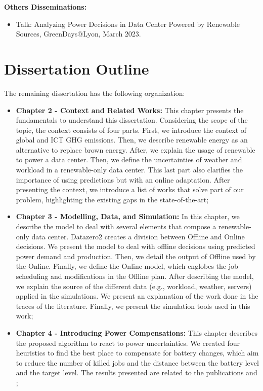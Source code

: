 \textbf{Others Disseminations:}
\begin{itemize}
    \item Talk: Analyzing Power Decisions in Data Center
    Powered by Renewable Sources, GreenDays@Lyon, March 2023.
\end{itemize}

\section{Dissertation Outline}
The remaining dissertation has the following organization:
\begin{itemize}
    \item[] \textbf{Chapter 2 - Context and Related Works:} This chapter presents the fundamentals to understand this dissertation. Considering the scope of the topic, the context consists of four parts. First, we introduce the context of global and ICT GHG emissions. Then, we describe renewable energy as an alternative to replace brown energy. After, we explain the usage of renewable to power a data center. Then, we define the uncertainties of weather and workload in a renewable-only data center. This last part also clarifies the importance of using predictions but with an online adaptation. After presenting the context, we introduce a list of works that solve part of our problem, highlighting the existing gaps in the state-of-the-art;
    \item[] \textbf{Chapter 3 - Modelling, Data, and Simulation:} In this chapter, we describe the model to deal with several elements that compose a renewable-only data center. Datazero2 creates a division between Offline and Online decisions. We present the model to deal with offline decisions using predicted power demand and production. Then, we detail the output of Offline used by the Online. Finally, we define the Online model, which englobes the job scheduling and modifications in the Offline plan. After describing the model, we explain the source of the different data (e.g., workload, weather, servers) applied in the simulations. We present an explanation of the work done in the traces of the literature. Finally, we present the simulation tools used in this work;
    \item[] \textbf{Chapter 4 - Introducing Power Compensations:} This chapter describes the proposed algorithm to react to power uncertainties. We created four heuristics to find the best place to compensate for battery changes, which aim to reduce the number of killed jobs and the distance between the battery level and the target level. The results presented are related to the publications \cite{de2022mixing} and \cite{de2022analyzing};

\end{itemize}
